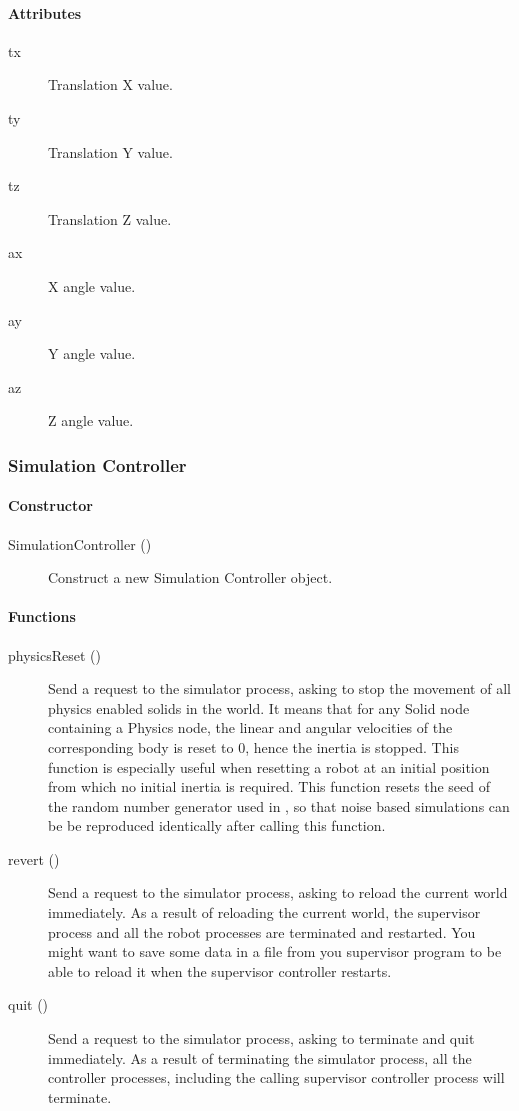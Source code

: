 \paragraph{Attributes}

\noindent
\begin{description}
\item[tx] Translation X value.
\item[ty] Translation Y value.
\item[tz] Translation Z value.
\item[ax] X angle value.
\item[ay] Y angle value.
\item[az] Z angle value.
\end{description}

\subsubsection{Simulation Controller}

\paragraph{Constructor}

\noindent
\begin{description}
\item[{SimulationController ()}] Construct a new Simulation Controller
  object.
\end{description}

\paragraph{Functions}

\noindent
\begin{description}
\item[physicsReset ()] Send a request to the simulator process,
  asking to stop the movement of all physics enabled solids in the
  world. It means that for any Solid node containing a Physics node,
  the linear and angular velocities of the corresponding body is reset
  to 0, hence the inertia is stopped. This function is especially
  useful when resetting a robot at an initial position from which no
  initial inertia is required.  This function resets the seed of the
  random number generator used in \webots, so that noise based
  simulations can be be reproduced identically after calling this
  function.

\item[revert ()] Send a request to the simulator process, asking to
  reload the current world immediately. As a result of reloading the
  current world, the supervisor process and all the robot processes
  are terminated and restarted. You might want to save some data in a
  file from you supervisor program to be able to reload it when the
  supervisor controller restarts.

\item[quit ()] Send a request to the simulator process, asking to
  terminate and quit immediately. As a result of terminating the
  simulator process, all the controller processes, including the
  calling supervisor controller process will terminate.
\end{description}

